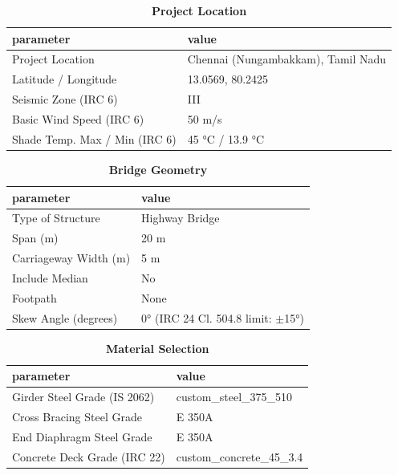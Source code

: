 \documentclass[12pt,a4paper]{report}
\numberwithin{table}{chapter}
\numberwithin{figure}{chapter}
\begin{document}
\begin{table}[H]
\caption{\textbf{Project Location}}
\label{subsec:project-location}
\begin{tabular}{|L{5.5cm}|L{8.5cm}|}
\hline
\textbf{parameter} & \textbf{value} \\
\hline
\textnormal{Project Location} & Chennai (Nungambakkam), Tamil Nadu \\
\hline
\textnormal{Latitude / Longitude} & 13.0569, 80.2425 \\
\hline
\textnormal{Seismic Zone (IRC 6)} & III \\
\hline
\textnormal{Basic Wind Speed (IRC 6)} & 50 m/s \\
\hline
\textnormal{Shade Temp. Max / Min (IRC 6)} & 45 °C / 13.9 °C \\
\hline
\end{tabular}
\vspace{0.4cm}
\end{table}

\begin{table}[H]
\caption{\textbf{Bridge Geometry}}
\label{subsec:bridge-geometry}
\begin{tabular}{|L{5.5cm}|L{8.5cm}|}
\hline
\textbf{parameter} & \textbf{value} \\
\hline
\textnormal{Type of Structure} & Highway Bridge \\
\hline
\textnormal{Span (m)} & 20 m \\
\hline
\textnormal{Carriageway Width (m)} & 5 m \\
\hline
\textnormal{Include Median} & No \\
\hline
\textnormal{Footpath} & None \\
\hline
\textnormal{Skew Angle (degrees)} & 0° (IRC 24 Cl. 504.8 limit: $\pm$15°) \\
\hline
\end{tabular}
\end{table}
\vspace{0.4cm}

\begin{table}[H]
\caption{\textbf{Material Selection}}
\label{subsec:material}
\begin{tabular}{|L{5.5cm}|L{8.5cm}|}
\hline
\textbf{parameter} & \textbf{value} \\
\hline
\textnormal{Girder Steel Grade (IS 2062)} & custom\_\allowbreak{}steel\_\allowbreak{}375\_\allowbreak{}510 \\
\hline
\textnormal{Cross Bracing Steel Grade} & E 350A \\
\hline
\textnormal{End Diaphragm Steel Grade} & E 350A \\
\hline
\textnormal{Concrete Deck Grade (IRC 22)} & custom\_\allowbreak{}concrete\_\allowbreak{}45\_\allowbreak{}3.4 \\
\hline
\end{tabular}
\end{table}
\vspace{0.4cm}
\end{document}
